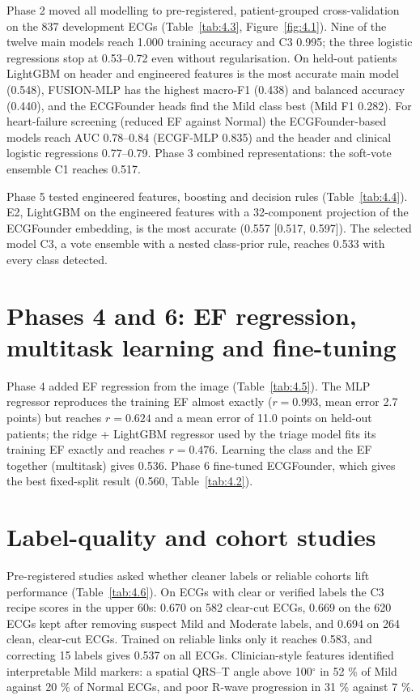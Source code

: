 Phase 2 moved all modelling to pre-registered, patient-grouped cross-validation on the 837 development ECGs (Table~\ref{tab:4.3}, Figure~\ref{fig:4.1}). Nine of the twelve main models reach 1.000 training accuracy and C3 0.995; the three logistic regressions stop at 0.53--0.72 even without regularisation. On held-out patients LightGBM on header and engineered features is the most accurate main model (0.548), FUSION-MLP has the highest macro-F1 (0.438) and balanced accuracy (0.440), and the ECGFounder heads find the Mild class best (Mild F1 0.282). For heart-failure screening (reduced EF against Normal) the ECGFounder-based models reach AUC 0.78--0.84 (ECGF-MLP 0.835) and the header and clinical logistic regressions 0.77--0.79. Phase 3 combined representations: the soft-vote ensemble C1 reaches 0.517.



Phase 5 tested engineered features, boosting and decision rules (Table~\ref{tab:4.4}). E2, LightGBM on the engineered features with a 32-component projection of the ECGFounder embedding, is the most accurate (0.557 [0.517, 0.597]). The selected model C3, a vote ensemble with a nested class-prior rule, reaches 0.533 with every class detected.

\section{Phases 4 and 6: EF regression, multitask learning and fine-tuning}\label{sec:4.3}



Phase 4 added EF regression from the image (Table~\ref{tab:4.5}). The MLP regressor reproduces the training EF almost exactly ($r=0.993$, mean error 2.7 points) but reaches $r=0.624$ and a mean error of 11.0 points on held-out patients; the ridge + LightGBM regressor used by the triage model fits its training EF exactly and reaches $r=0.476$. Learning the class and the EF together (multitask) gives 0.536. Phase 6 fine-tuned ECGFounder, which gives the best fixed-split result (0.560, Table~\ref{tab:4.2}).

\section{Label-quality and cohort studies}\label{sec:4.4}



Pre-registered studies asked whether cleaner labels or reliable cohorts lift performance (Table~\ref{tab:4.6}). On ECGs with clear or verified labels the C3 recipe scores in the upper 60s: 0.670 on 582 clear-cut ECGs, 0.669 on the 620 ECGs kept after removing suspect Mild and Moderate labels, and 0.694 on 264 clean, clear-cut ECGs. Trained on reliable links only it reaches 0.583, and correcting 15 labels gives 0.537 on all ECGs. Clinician-style features identified interpretable Mild markers: a spatial QRS--T angle above 100$^{\circ}$ in 52 \% of Mild against 20 \% of Normal ECGs, and poor R-wave progression in 31 \% against 7 \%.


